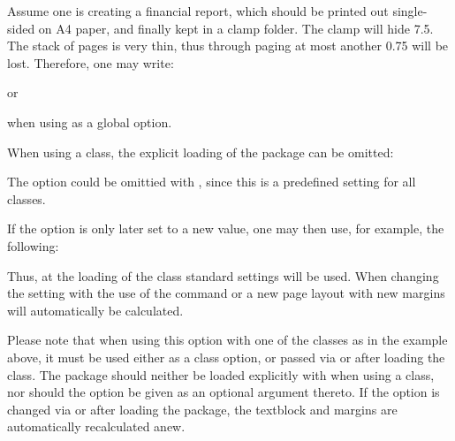 \begin{Example}
  Assume one is creating a financial report, which should be printed
  out single-sided on A4 paper, and finally kept in a clamp
  folder. The clamp will hide 7.5. The stack of pages is very
  thin, thus through paging at most another 0.75 will be
  lost. Therefore, one may write:
  or
  when using  as a global option.

  When using a {\KOMAScript} class, the explicit loading of the
   package can be omitted:
  The option  could be omittied with ,
  since this is a predefined setting for all {\KOMAScript} classes.

  If the option is only later set to a new value, one may then use,
  for example, the following:
  Thus, at the loading of the  class standard settings
  will be used. When changing the setting with the use of the command
   or  a new page layout with new
  margins will automatically be calculated.
\end{Example}

Please note that when using this option with one of the {\KOMAScript}
classes as in the example above, it must be used either as a class
option, or passed via  or  after
loading the class. The  package should neither be
loaded explicitly with  when using a {\KOMAScript}
class, nor should the option be given as an optional argument
thereto. If the option is changed via  or
 after loading the package, the textblock and
margins are automatically recalculated anew.%
%

